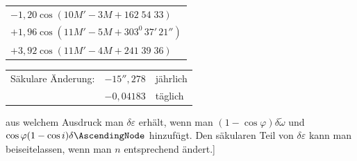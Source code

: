\begin{landscape}
\begin{longtable}{@{}l@{}}
\(-1{,}20\cos(10M'-3M+162\;54\;33)\)\\[3pt]
\(+1{,}96\cos(11M'-5M+303^0\,37'\,21'')\)\\
\(+3{,}92\cos(11M'-4M+241\;39\;36)\)
\end{longtable}
\begin{center}
\begin{tabular}{@{}lrl@{}}
Säkulare Änderung: & \(-15''{,}278\)&jährlich\\
&\(-0{,}04183\)&täglich
\end{tabular}
\end{center}
\endgroup
aus welchem Ausdruck man \(\delta\varepsilon\) erhält, wenn man \((1-\cos\varphi)\delta\tilde\omega\) und \(\cos\varphi(1-\cos i)\delta\AscendingNode\) hinzufügt. Den säkularen Teil von \(\delta\varepsilon\) kann man beiseitelassen, wenn man \(n\) entsprechend ändert.]
\clearpage
\endgroup
\end{landscape}
